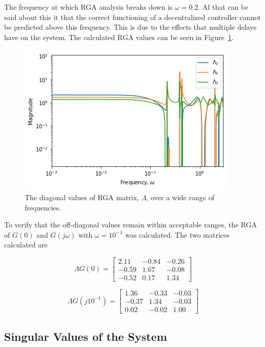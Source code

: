 The frequency at which RGA analysis breaks down is $\omega = 0.2$. Al that can be said about this it that the correct functioning of a decentralized controller cannot be predicted above this frequency. This is due to the effects that multiple delays have on the system. The calculated RGA values can be seen in Figure~\ref{fig:rga-values}.

\begin{figure}[H]
	\centering
	\includegraphics[width=0.7\linewidth]{"Figures/RGA Values"}
	\caption{The diagonal values of RGA matrix, $\Lambda$, over a wide range of frequencies.}
	\label{fig:rga-values}
\end{figure}

To verify that the off-diagonal values remain within acceptable ranges, the RGA of $G(0)$ and $G(j\omega)$ with $\omega = 10^{-1}$ was calculated. The two matrices calculated are

\begin{equation}
	\Lambda G(0) = \begin{bmatrix}
	2.11 & -0.84 & -0.26\\
	-0.59 & 1.67 & -0.08\\
	-0.52 & 0.17 & 1.34
	\end{bmatrix}
\end{equation}

\begin{equation}
\Lambda G(j10^{-1}) = \begin{bmatrix}
1.36 & -0.33 & -0.03\\
-0.37 & 1.34 & -0.03\\
0.02 & -0.02 & 1.00
\end{bmatrix}
\end{equation}

\subsection{Singular Values of the System}

